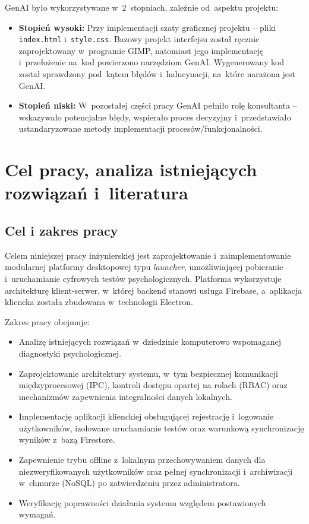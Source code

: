 \documentclass[12pt, a4paper, oneside]{report}
\begin{document}
GenAI było wykorzystywane w~2~stopniach, zależnie od~aspektu projektu:
\begin{itemize}[noitemsep]
	\item \textbf{Stopień wysoki:} Przy implementacji szaty graficznej projektu --
	      pliki \texttt{index.html} i~\texttt{style.css}. Bazowy projekt interfejsu
	      został ręcznie zaprojektowany w~programie GIMP, natomiast jego
	      implementację i~przełożenie na~kod powierzono narzędziom GenAI.
	      Wygenerowany kod został sprawdzony pod~kątem błędów i~halucynacji,
	      na~które narażona jest GenAI.
	\item \textbf{Stopień niski:} W~pozostałej części pracy GenAI pełniło rolę
	      konsultanta -- wskazywało potencjalne błędy, wspierało proces decyzyjny
	      i~przedstawiało ustandaryzowane metody implementacji
	      procesów/funkcjonalności.
\end{itemize}

\chapter{Cel pracy, analiza istniejących rozwiązań i~literatura}
\label{chap:cel-analiza}


\section{Cel i zakres pracy}
\label{sec:cel}

Celem niniejszej pracy inżynierskiej jest zaprojektowanie i~zaimplementowanie
modularnej platformy desktopowej typu \textit{launcher}, umożliwiającej
pobieranie i~uruchamianie cyfrowych testów psychologicznych. Platforma
wykorzystuje architekturę klient-serwer, w~której backend stanowi usługa
Firebase, a~aplikacja kliencka została zbudowana w~technologii Electron.

Zakres pracy obejmuje:
\begin{itemize}[noitemsep]
	\item Analizę istniejących rozwiązań w~dziedzinie komputerowo wspomaganej
	      diagnostyki psychologicznej.
	\item Zaprojektowanie architektury systemu, w~tym bezpiecznej komunikacji
	      międzyprocesowej (IPC), kontroli dostępu opartej na rolach (RBAC)
	      oraz mechanizmów zapewnienia integralności danych lokalnych.
	\item Implementację aplikacji klienckiej obsługującej rejestrację
	      i~logowanie użytkowników, izolowane uruchamianie testów oraz
	      warunkową synchronizację wyników z~bazą Firestore.
	\item Zapewnienie trybu offline z~lokalnym przechowywaniem danych dla
	      niezweryfikowanych użytkowników oraz pełnej synchronizacji
	      i~archiwizacji w~chmurze (NoSQL) po zatwierdzeniu przez
	      administratora.
	\item Weryfikację poprawności działania systemu względem postawionych
	      wymagań.
\end{itemize}
\end{document}
